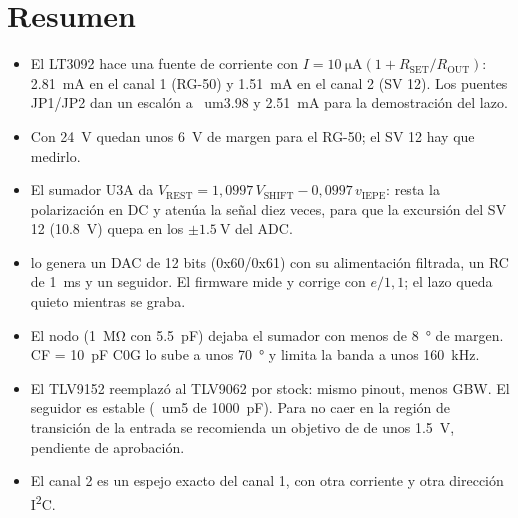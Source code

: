 \section*{Resumen}
\begin{itemize}
  \item El LT3092 hace una fuente de corriente con $I = \SI{10}{\micro\ampere}(1 + R_{\mathrm{SET}}/R_{\mathrm{OUT}})$:
        \SI{2.81}{\milli\ampere} en el canal 1 (RG-50) y \SI{1.51}{\milli\ampere} en el canal 2 (SV 12). Los puentes
        JP1/JP2 dan un escalón a \
um{3.98} y \SI{2.51}{\milli\ampere} para la demostración del lazo.
  \item Con \SI{24}{\volt} quedan unos \SI{6}{\volt} de margen para el RG-50; el SV 12 hay que medirlo.
  \item El sumador U3A da $V_{\mathrm{REST}} = 1{,}0997\,V_{\mathrm{SHIFT}} - 0{,}0997\,v_{\mathrm{IEPE}}$: resta la
        polarización en DC y atenúa la señal diez veces, para que la excursión del SV 12 (\SI{10.8}{\volt}) quepa en los
        $\pm\SI{1.5}{\volt}$ del ADC.
  \item {} lo genera un DAC de 12 bits (0x60/0x61) con su alimentación filtrada, un RC de \SI{1}{\milli\second}
        y un seguidor. El firmware mide \net{DC_MON} y corrige \net{VSHIFT} con $e/1{,}1$; el lazo queda quieto
        mientras se graba.
  \item El nodo  (\SI{1}{\mega\ohm} con \SI{5.5}{\pico\farad}) dejaba el sumador con menos de
        \SI{8}{\degree} de margen. CF = \SI{10}{\pico\farad} C0G lo sube a unos \SI{70}{\degree} y limita la banda a
        unos \SI{160}{\kilo\hertz}.
  \item El TLV9152 reemplazó al TLV9062 por stock: mismo pinout, menos GBW. El seguidor es estable (\
um{5} de
        \SI{1000}{\pico\farad}). Para no caer en la región de transición de la entrada se recomienda un objetivo de
         de unos \SI{1.5}{\volt}, pendiente de aprobación.
  \item El canal 2 es un espejo exacto del canal 1, con otra corriente y otra dirección I\textsuperscript{2}C.
\end{itemize}
